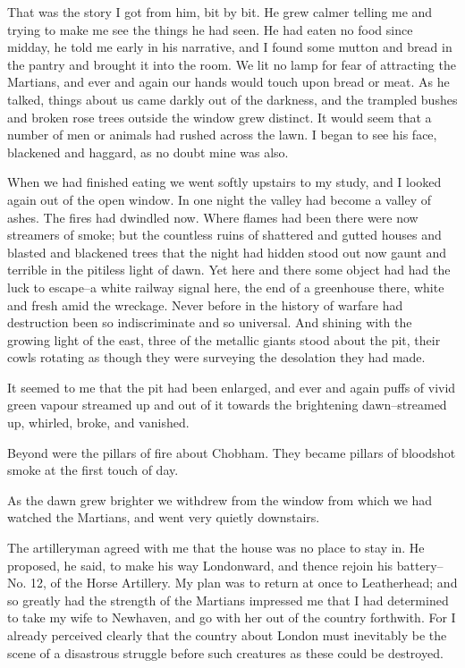 That was the story I got from him, bit by bit. He grew calmer
telling me and trying to make me see the things he had seen. He had
eaten no food since midday, he told me early in his narrative, and
I found some mutton and bread in the pantry and brought it into the
room. We lit no lamp for fear of attracting the Martians, and ever
and again our hands would touch upon bread or meat. As he talked,
things about us came darkly out of the darkness, and the trampled
bushes and broken rose trees outside the window grew distinct. It
would seem that a number of men or animals had rushed across the
lawn. I began to see his face, blackened and haggard, as no doubt
mine was also.

When we had finished eating we went softly upstairs to my study,
and I looked again out of the open window. In one night the valley
had become a valley of ashes. The fires had dwindled now. Where
flames had been there were now streamers of smoke; but the
countless ruins of shattered and gutted houses and blasted and
blackened trees that the night had hidden stood out now gaunt and
terrible in the pitiless light of dawn. Yet here and there some
object had had the luck to escape--a white railway signal here, the
end of a greenhouse there, white and fresh amid the wreckage. Never
before in the history of warfare had destruction been so
indiscriminate and so universal. And shining with the growing light
of the east, three of the metallic giants stood about the pit,
their cowls rotating as though they were surveying the desolation
they had made.

It seemed to me that the pit had been enlarged, and ever and again
puffs of vivid green vapour streamed up and out of it towards the
brightening dawn--streamed up, whirled, broke, and vanished.

Beyond were the pillars of fire about Chobham. They became pillars
of bloodshot smoke at the first touch of day.

As the dawn grew brighter we withdrew from the window from which we
had watched the Martians, and went very quietly downstairs.

The artilleryman agreed with me that the house was no place to stay
in. He proposed, he said, to make his way Londonward, and thence
rejoin his battery--No. 12, of the Horse Artillery. My plan was to
return at once to Leatherhead; and so greatly had the strength of
the Martians impressed me that I had determined to take my wife to
Newhaven, and go with her out of the country forthwith. For I
already perceived clearly that the country about London must
inevitably be the scene of a disastrous struggle before such
creatures as these could be destroyed.

